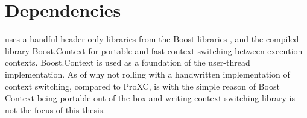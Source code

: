 \section{Dependencies}
\label{sec:dependencies}


\Proxc{} uses a handful header\hyp{}only libraries from the Boost \Cpp{} libraries \citep{boost2017boost}, and the compiled library Boost.Context \citep{kowalke2017boost} for portable and fast context switching between execution contexts. Boost.Context is used as a foundation of the user\hyp{}thread implementation. As of why not rolling with a handwritten implementation of context switching, compared to ProXC, is with the simple reason of Boost Context being portable out of the box and writing context switching library is not the focus of this thesis.

